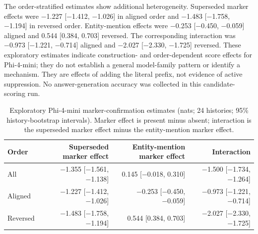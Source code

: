 The order-stratified estimates show additional heterogeneity. Superseded marker effects were −1.227 [−1.412, −1.026] in aligned order and −1.483 [−1.758, −1.194] in reversed order. Entity-mention effects were −0.253 [−0.450, −0.059] aligned and 0.544 [0.384, 0.703] reversed. The corresponding interaction was −0.973 [−1.221, −0.714] aligned and −2.027 [−2.330, −1.725] reversed. These exploratory estimates indicate construction- and order-dependent score effects for Phi-4-mini; they do not establish a general model-family pattern or identify a mechanism. They are effects of adding the literal prefix, not evidence of active suppression. No answer-generation accuracy was collected in this candidate-scoring run.

\begin{table}[h]
\caption{Exploratory Phi-4-mini marker-confirmation estimates (nats; 24 histories; 95\% history-bootstrap intervals). Marker effect is present minus absent; interaction is the superseded marker effect minus the entity-mention marker effect.}
\label{tab:d-phi-marker}
\begin{center}
\small
\begin{tabular}{@{}lrrr@{}}
\toprule
Order & Superseded marker effect & Entity-mention marker effect & Interaction \\
\midrule
All & −1.355 [−1.561, −1.138] & 0.145 [−0.018, 0.310] & −1.500 [−1.734, −1.264] \\
Aligned & −1.227 [−1.412, −1.026] & −0.253 [−0.450, −0.059] & −0.973 [−1.221, −0.714] \\
Reversed & −1.483 [−1.758, −1.194] & 0.544 [0.384, 0.703] & −2.027 [−2.330, −1.725] \\
\bottomrule
\end{tabular}
\end{center}
\end{table}

\FloatBarrier
